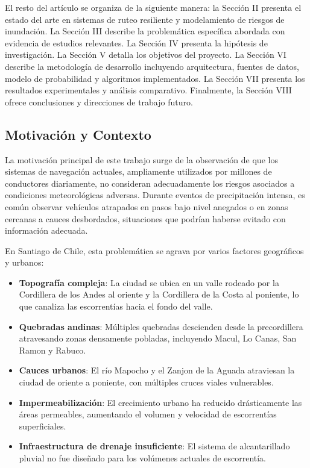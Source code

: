\documentclass[conference]{IEEEtran}
\begin{document}
El resto del artículo se organiza de la siguiente manera: la Sección II presenta el estado del arte en sistemas de ruteo resiliente y modelamiento de riesgos de inundación. La Sección III describe la problemática específica abordada con evidencia de estudios relevantes. La Sección IV presenta la hipótesis de investigación. La Sección V detalla los objetivos del proyecto. La Sección VI describe la metodología de desarrollo incluyendo arquitectura, fuentes de datos, modelo de probabilidad y algoritmos implementados. La Sección VII presenta los resultados experimentales y análisis comparativo. Finalmente, la Sección VIII ofrece conclusiones y direcciones de trabajo futuro.

\subsection{Motivación y Contexto}

La motivación principal de este trabajo surge de la observación de que los sistemas de navegación actuales, ampliamente utilizados por millones de conductores diariamente, no consideran adecuadamente los riesgos asociados a condiciones meteorológicas adversas. Durante eventos de precipitación intensa, es común observar vehículos atrapados en pasos bajo nivel anegados o en zonas cercanas a cauces desbordados, situaciones que podrían haberse evitado con información adecuada.

En Santiago de Chile, esta problemática se agrava por varios factores geográficos y urbanos:

\begin{itemize}
    \item \textbf{Topografía compleja}: La ciudad se ubica en un valle rodeado por la Cordillera de los Andes al oriente y la Cordillera de la Costa al poniente, lo que canaliza las escorrentías hacia el fondo del valle.

    \item \textbf{Quebradas andinas}: Múltiples quebradas descienden desde la precordillera atravesando zonas densamente pobladas, incluyendo Macul, Lo Canas, San Ramon y Rabuco.

    \item \textbf{Cauces urbanos}: El río Mapocho y el Zanjon de la Aguada atraviesan la ciudad de oriente a poniente, con múltiples cruces viales vulnerables.

    \item \textbf{Impermeabilización}: El crecimiento urbano ha reducido drásticamente las áreas permeables, aumentando el volumen y velocidad de escorrentías superficiales.

    \item \textbf{Infraestructura de drenaje insuficiente}: El sistema de alcantarillado pluvial no fue diseñado para los volúmenes actuales de escorrentía.
\end{itemize}
\end{document}
